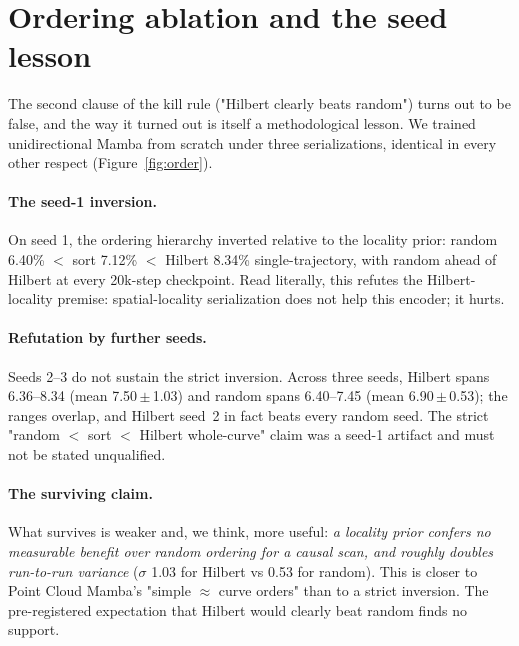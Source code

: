 \documentclass[11pt]{article}
\newcommand{\pct}{\%}
\begin{document}
\section{Ordering ablation and the seed lesson}
\label{sec:order}

The second clause of the kill rule ("Hilbert clearly beats random") turns out
to be false, and the way it turned out is itself a methodological lesson. We
trained unidirectional Mamba from scratch under three serializations, identical
in every other respect (Figure~\ref{fig:order}).

\paragraph{The seed-1 inversion.}
On seed 1, the ordering hierarchy inverted relative to the locality prior:
random 6.40\pct{} $<$ sort 7.12\pct{} $<$ Hilbert 8.34\pct{} single-trajectory,
with random ahead of Hilbert at every 20k-step checkpoint. Read literally, this
refutes the Hilbert-locality premise: spatial-locality serialization does not
help this encoder; it hurts.

\paragraph{Refutation by further seeds.}
Seeds 2--3 do not sustain the strict inversion. Across three seeds, Hilbert spans
6.36--8.34 (mean 7.50\,$\pm$\,1.03) and random spans 6.40--7.45
(mean 6.90\,$\pm$\,0.53); the ranges overlap, and Hilbert seed~2 in fact beats
every random seed. The strict "random $<$ sort $<$ Hilbert whole-curve" claim was
a seed-1 artifact and must not be stated unqualified.

\paragraph{The surviving claim.}
What survives is weaker and, we think, more useful: \emph{a locality prior
confers no measurable benefit over random ordering for a causal scan, and roughly
doubles run-to-run variance} ($\sigma$ 1.03 for Hilbert vs 0.53 for random). This
is closer to Point Cloud Mamba's "simple $\approx$ curve orders"
\citep{pcm2025} than to a strict inversion. The pre-registered expectation that
Hilbert would clearly beat random finds no support.
\end{document}
